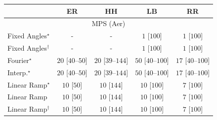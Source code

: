 \begin{tabular}{l|cccc|}
\toprule
            & ER & HH & LB & RR \\
\midrule
\multicolumn{5}{c}{\rule{0pt}{8pt}MPS (Aer)} \\
\midrule
Fixed Angles$^\star$ & {\cellcolor[HTML]{000000}} \color[HTML]{F1F1F1} {\cellcolor{white}} \color{black} - & {\cellcolor[HTML]{000000}} \color[HTML]{F1F1F1} {\cellcolor{white}} \color{black} - & {\cellcolor[HTML]{F7FCF5}} \color[HTML]{000000} $1$ [$100$] & {\cellcolor[HTML]{F7FCF5}} \color[HTML]{000000} $1$ [$100$] \\
Fixed Angles$^\dagger$ & {\cellcolor[HTML]{000000}} \color[HTML]{F1F1F1} {\cellcolor{white}} \color{black} - & {\cellcolor[HTML]{000000}} \color[HTML]{F1F1F1} {\cellcolor{white}} \color{black} - & {\cellcolor[HTML]{F7FCF5}} \color[HTML]{000000} $1$ [$100$] & {\cellcolor[HTML]{F7FCF5}} \color[HTML]{000000} $1$ [$100$] \\
Fourier$^\star$ & {\cellcolor[HTML]{F4FBF1}} \color[HTML]{000000} $20$ [$40$--$50$] & {\cellcolor[HTML]{F4FBF1}} \color[HTML]{000000} $20$ [$39$--$144$] & {\cellcolor[HTML]{EEF8EA}} \color[HTML]{000000} $50$ [$40$--$100$] & {\cellcolor[HTML]{F4FBF2}} \color[HTML]{000000} $17$ [$40$--$100$] \\
Interp.$^\star$ & {\cellcolor[HTML]{F4FBF1}} \color[HTML]{000000} $20$ [$40$--$50$] & {\cellcolor[HTML]{F4FBF1}} \color[HTML]{000000} $20$ [$39$--$144$] & {\cellcolor[HTML]{EEF8EA}} \color[HTML]{000000} $50$ [$40$--$100$] & {\cellcolor[HTML]{F4FBF2}} \color[HTML]{000000} $17$ [$40$--$100$] \\
Linear Ramp$^\star$ & {\cellcolor[HTML]{F6FCF4}} \color[HTML]{000000} $10$ [$50$] & {\cellcolor[HTML]{F6FCF4}} \color[HTML]{000000} $10$ [$144$] & {\cellcolor[HTML]{F6FCF4}} \color[HTML]{000000} $10$ [$100$] & {\cellcolor[HTML]{F6FCF4}} \color[HTML]{000000} $7$ [$100$] \\
Linear Ramp & {\cellcolor[HTML]{F6FCF4}} \color[HTML]{000000} $10$ [$50$] & {\cellcolor[HTML]{F6FCF4}} \color[HTML]{000000} $10$ [$144$] & {\cellcolor[HTML]{F6FCF4}} \color[HTML]{000000} $10$ [$100$] & {\cellcolor[HTML]{F6FCF4}} \color[HTML]{000000} $7$ [$100$] \\
Linear Ramp$^\dagger$ & {\cellcolor[HTML]{F6FCF4}} \color[HTML]{000000} $10$ [$50$] & {\cellcolor[HTML]{F6FCF4}} \color[HTML]{000000} $10$ [$144$] & {\cellcolor[HTML]{F6FCF4}} \color[HTML]{000000} $10$ [$100$] & {\cellcolor[HTML]{F6FCF4}} \color[HTML]{000000} $7$ [$100$] \\

\end{tabular}
